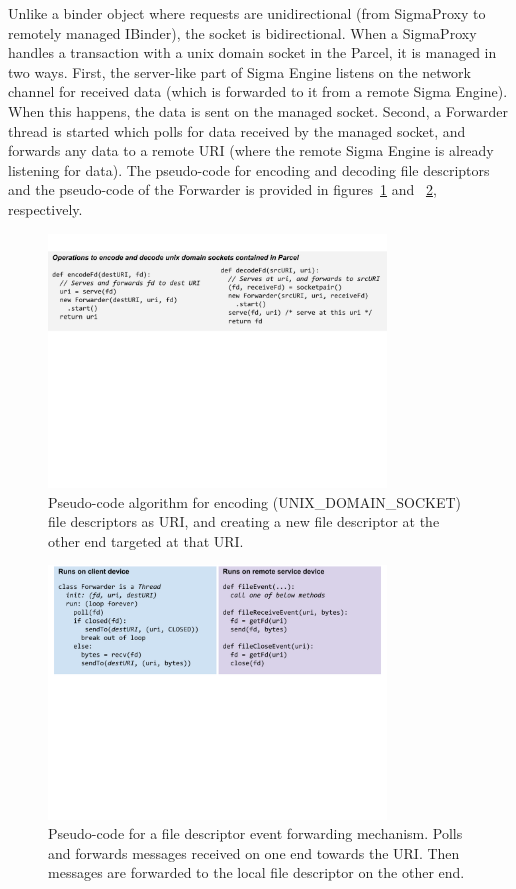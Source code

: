 \documentclass[prodmode]{acmlarge}
\begin{document}
Unlike a binder object where requests are unidirectional (from SigmaProxy to remotely managed IBinder), the socket is bidirectional. When a SigmaProxy handles a transaction with a unix domain socket in the Parcel, it is managed in two ways. First, the server-like part of Sigma Engine listens on the network channel for received data (which is forwarded to it from a remote Sigma Engine). When this happens, the data is sent on the managed socket. Second, a Forwarder thread is started which polls for data received by the managed socket, and forwards any data to a remote URI (where the remote Sigma Engine is already listening for data). The pseudo-code for encoding and decoding file descriptors and the pseudo-code of the Forwarder is provided in figures~\ref{fig:encodeFds} and ~\ref{fig:fdForwarder}, respectively.

\begin{figure}[h]
\centering
\includegraphics[width=0.8\textwidth]{drawings/encodeFds.pdf}
\caption{Pseudo-code algorithm for encoding (UNIX\_DOMAIN\_SOCKET) file descriptors as URI, and creating a new file descriptor at the other end targeted at that URI.}
\label{fig:encodeFds}
\end{figure}

\begin{figure}[h]
\centering
\includegraphics[width=0.8\textwidth]{drawings/forwardFds.pdf}
\caption{Pseudo-code for a file descriptor event forwarding mechanism. Polls and forwards messages received on one end towards the URI. Then messages are forwarded to the local file descriptor on the other end.}
\label{fig:fdForwarder}
\end{figure}
\end{document}
